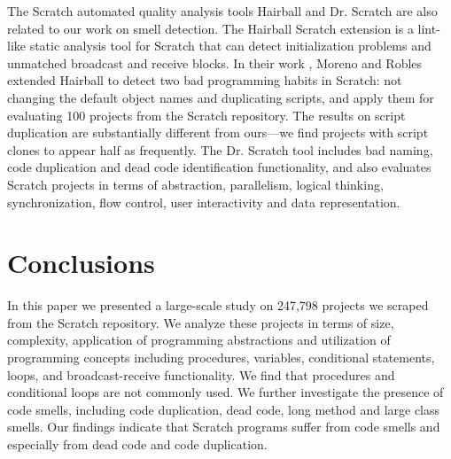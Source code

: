 \documentclass{sig-alternate-05-2015}
\begin{document}
The Scratch automated quality analysis tools Hairball \cite{boe_hairball:_2013} and Dr. Scratch \cite{moreno-leon_dr._2015} are also related to our work on smell detection. The Hairball Scratch extension is a lint-like static analysis tool for Scratch that can detect initialization problems and unmatched broadcast and receive blocks. In their work \cite{moreno_automatic_2014}, Moreno and Robles extended Hairball to detect two bad programming habits in Scratch: not changing the default object names and duplicating scripts, and apply them for evaluating 100 projects from the Scratch repository. The results on script duplication are substantially different from ours---we find projects with script clones to appear half as frequently. The Dr. Scratch tool \cite{moreno-leon_dr._2015} includes bad naming, code duplication and dead code identification functionality, and also evaluates Scratch projects in terms of abstraction, parallelism, logical thinking, synchronization, flow control, user interactivity and data representation.


\section{Conclusions}
\label{sec:conclusion}
In this paper we presented a large-scale study on 247,798 projects we scraped from the Scratch repository. We analyze these projects in terms of size, complexity, application of programming abstractions and utilization of programming concepts including procedures, variables, conditional statements, loops, and broadcast-receive functionality. We find that procedures and conditional loops are not commonly used. We further investigate the presence of code smells, including code duplication, dead code, long method and large class smells. Our findings indicate that Scratch programs suffer from code smells and especially from dead code and code duplication.
\end{document}
